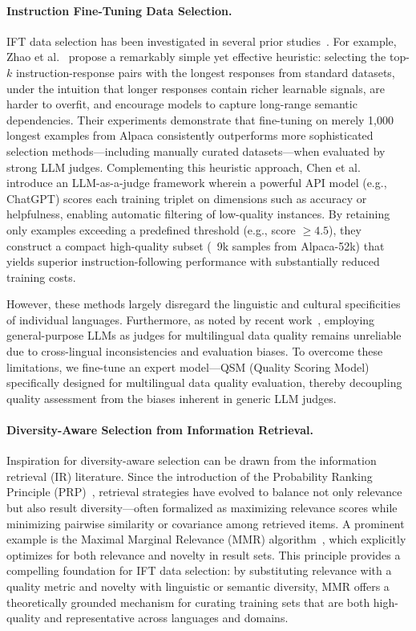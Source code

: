 \documentclass[sigconf]{acmart}
\begin{document}
\paragraph{Instruction Fine-Tuning Data Selection.}
IFT data selection has been investigated in several prior studies~\cite{chen2023improvingtranslationfaithfulnesslarge, liu2024makesgooddataalignment, du2023modsmodelorienteddataselection, tree_instruct, car}. For example, Zhao et al.~\cite{long_is_more} propose a remarkably simple yet effective heuristic: selecting the top-$k$ instruction-response pairs with the longest responses from standard datasets, under the intuition that longer responses contain richer learnable signals, are harder to overfit, and encourage models to capture long-range semantic dependencies. Their experiments demonstrate that fine-tuning on merely 1,000 longest examples from Alpaca consistently outperforms more sophisticated selection methods—including manually curated datasets—when evaluated by strong LLM judges. Complementing this heuristic approach, Chen et al.~\cite{alpaca_gasus} introduce an LLM-as-a-judge framework wherein a powerful API model (e.g., ChatGPT) scores each training triplet on dimensions such as accuracy or helpfulness, enabling automatic filtering of low-quality instances. By retaining only examples exceeding a predefined threshold (e.g., score $\geq 4.5$), they construct a compact high-quality subset (~9k samples from Alpaca-52k) that yields superior instruction-following performance with substantially reduced training costs.

However, these methods largely disregard the linguistic and cultural specificities of individual languages. Furthermore, as noted by recent work~\cite{reliable_mulitlingual_llm_judge}, employing general-purpose LLMs as judges for multilingual data quality remains unreliable due to cross-lingual inconsistencies and evaluation biases. To overcome these limitations, we fine-tune an expert model—QSM (Quality Scoring Model) specifically designed for multilingual data quality evaluation, thereby decoupling quality assessment from the biases inherent in generic LLM judges.

\paragraph{Diversity-Aware Selection from Information Retrieval.}
Inspiration for diversity-aware selection can be drawn from the information retrieval (IR) literature. Since the introduction of the Probability Ranking Principle (PRP)~\cite{PRP_book}, retrieval strategies have evolved to balance not only relevance but also result diversity—often formalized as maximizing relevance scores while minimizing pairwise similarity or covariance among retrieved items. A prominent example is the Maximal Marginal Relevance (MMR) algorithm~\cite{MMR}, which explicitly optimizes for both relevance and novelty in result sets. This principle provides a compelling foundation for IFT data selection: by substituting relevance with a quality metric and novelty with linguistic or semantic diversity, MMR offers a theoretically grounded mechanism for curating training sets that are both high-quality and representative across languages and domains.
\end{document}
